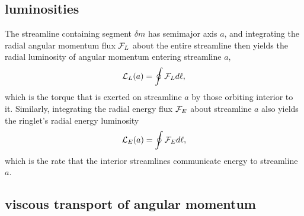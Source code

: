 \documentclass[preprint]{aastex62}
\begin{document}
\subsection{luminosities}
\label{subsec:luminosities}

The streamline containing segment $\delta m$ has semimajor axis $a$, and 
integrating the radial angular momentum flux ${\cal F}_L$ about the entire streamline
then yields the radial luminosity of angular momentum entering streamline $a$,
\begin{equation}
    \label{eqn:L_L}
    {\cal L}_L(a) = \oint {\cal F}_Ld\ell , 
\end{equation}
which is the torque that is exerted on streamline $a$ by those orbiting interior to it. Similarly,
integrating the radial energy flux ${\cal F}_E$ about streamline $a$ also yields the ringlet's radial energy luminosity
\begin{equation}
    \label{eqn:L_E}
    {\cal L}_E(a) = \oint {\cal F}_Ed\ell,
\end{equation}
which is the rate that the interior streamlines communicate energy to streamline $a$.

\subsection{viscous transport of angular momentum}
\label{subsec:viscous_flux}
\end{document}
